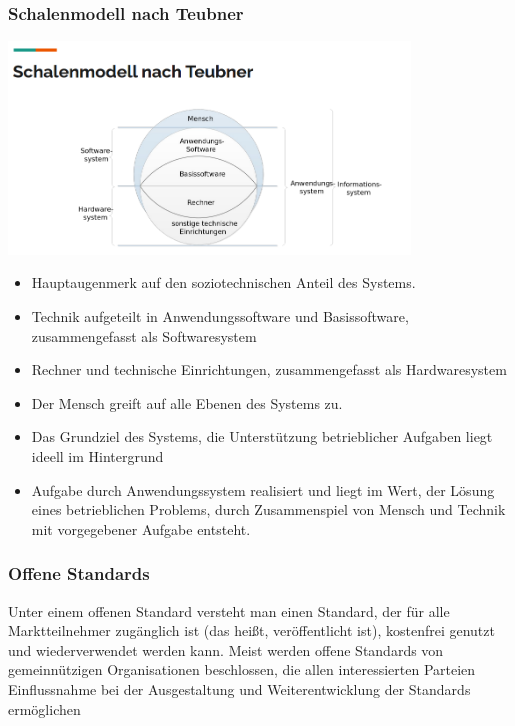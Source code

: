 \subsubsection{Schalenmodell nach Teubner}
\includegraphics[width=0.8\textwidth]{assets/SchalenmodellTeubner.PNG}
\begin{itemize}
  \item Hauptaugenmerk auf den soziotechnischen Anteil des Systems.
  \item Technik aufgeteilt in Anwendungssoftware und Basissoftware, zusammengefasst als Softwaresystem
  \item Rechner und technische Einrichtungen, zusammengefasst als Hardwaresystem
  \item Der Mensch greift auf alle Ebenen des Systems zu.
  \item Das Grundziel des Systems, die Unterstützung betrieblicher Aufgaben liegt ideell im Hintergrund
  \item Aufgabe durch Anwendungssystem realisiert und liegt im Wert, der Lösung eines betrieblichen Problems, durch Zusammenspiel von Mensch und Technik mit vorgegebener Aufgabe entsteht.
\end{itemize}

\subsubsection{Offene Standards}
Unter einem offenen Standard versteht man einen Standard, der für alle Marktteilnehmer zugänglich ist (das heißt, veröffentlicht ist), kostenfrei genutzt und wiederverwendet werden kann. Meist werden offene Standards von gemeinnützigen Organisationen beschlossen, die allen interessierten Parteien Einflussnahme bei der Ausgestaltung und Weiterentwicklung der Standards ermöglichen
